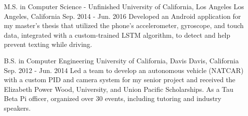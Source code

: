 

\begin{cventries}

  \cventry
    {M.S. in Computer Science - Unfinished} %
    {University of California, Los Angeles} %
    {Los Angeles, California} %
    {Sep. 2014 - Jun. 2016} %
    {Developed an Android application for my master's thesis that utilized the phone's accelerometer, gyroscope, and touch data, integrated with a custom-trained LSTM algorithm, to detect and help prevent texting while driving.} %
    {}

  \cventry
    {B.S. in Computer Engineering} %
    {University of California, Davis} %
    {Davis, California} %
    {Sep. 2012 - Jun. 2014} %
    {Led a team to develop an autonomous vehicle (NATCAR) with a custom PID and camera system for my senior project and received the Elizabeth Power Wood, University, and Union Pacific Scholarships. As a Tau Beta Pi officer, organized over 30 events, including tutoring and industry speakers.} %
    {}

\end{cventries}
